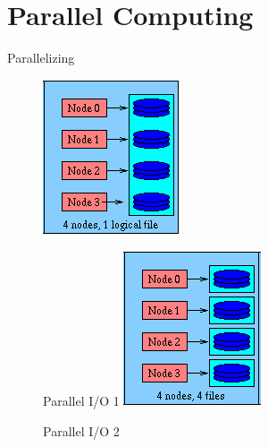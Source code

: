 \documentclass[t,english]{beamer}
\begin{document}
\section{Parallel Computing}
\begin{frame}{Parallelizing}
\begin{figure}[!htb]
\centering
{}
\centering
\includegraphics[scale=0.8]{./parallelio_0.png}

Parallel I/O 1 \cite{llnl}
\endminipage\hfill
\centering
{}
\centering
\includegraphics[scale=0.8]{./parallelio_1.png}

Parallel I/O 2 \cite{llnl}
\endminipage\hfill
\end{figure}
\end{frame}
\end{document}
